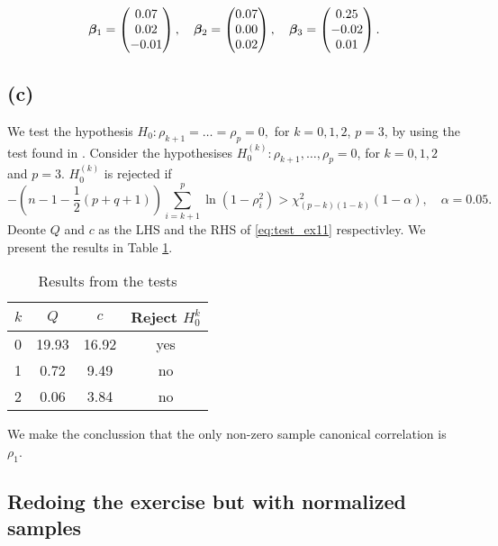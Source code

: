 \begin{equation*}
  \bm{\beta}_{1} =
  \begin{pmatrix}
    0.07 \\ 
    0.02 \\ 
    -0.01 
  \end{pmatrix}, \quad
  \bm{\beta}_{2} =
  \begin{pmatrix}
    0.07 \\ 
    0.00 \\ 
    0.02  
  \end{pmatrix}, \quad
  \bm{\beta}_{3} =
  \begin{pmatrix}
    0.25 \\ 
    -0.02 \\ 
    0.01  
  \end{pmatrix}.
\end{equation*}

\subsection*{(c)}
\label{sec:c-9}

We test the hypothesis $H_0: \rho_{k+1} = \dots = \rho_{p} = 0,$ for $k
= 0,1,2$, $p = 3$, by using the test found in
\cite[p. 565]{book}. Consider the hypothesises $H_{0}^{(k)}:
\rho_{k+1},\dots, \rho_{p} = 0$, for $k = 0,1,2$ and $p =
3$. $H_{0}^{(k)}$ is rejected if 
\begin{equation}\label{eq:test_ex11}
  -\left(n - 1  - \frac{1}{2}(p+q+1)\right) \sum_{i = k+1}^{p} \ln (1 -
  \rho_{i}^{2}) > \chi^{2}_{(p-k)(1-k)}(1-\alpha), \quad \alpha = 0.05.
\end{equation}
Deonte $Q$ and $c$ as the LHS and the RHS of \eqref{eq:test_ex11}
respectivley. We present the results in Table \ref{tab:test_ex11}. 
\begin{table}
  \centering
  \begin{tabular}{l|ccc}
    $k$&$Q$&$c$& Reject $H_{0}^{k}$ \\ \hline
    0 &19.93 &16.92 & yes \\ 
    1 &0.72 &9.49 & no \\ 
    2 &0.06 &3.84 & no  
  \end{tabular}
  \caption{Results from the tests}
  \label{tab:test_ex11}
\end{table}
We make the conclussion that the only non-zero sample canonical
correlation is $\rho_{1}$.
\subsection*{Redoing the exercise but with normalized samples}
\label{sec:redoing-exercise-but}

